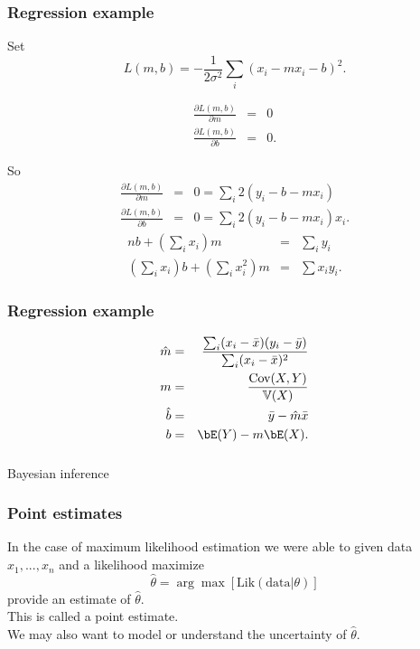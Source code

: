 \begin{frame}[fragile]\frametitle{Regression example}
{\tiny

Set
$$L(m,b) = - \frac{1}{2 \sigma^2} \sum_i (x_i - m x_i - b )^2.$$ 

\begin{eqnarray*}
\frac{\partial L(m,b)}{\partial m} & = & 0 \\
\frac{\partial L(m,b)}{\partial b} & = & 0. 
\end{eqnarray*}

So
\begin{eqnarray*}
\frac{\partial L(m,b)}{\partial m} & = & 0 = \sum_i 2(y_i - b - m x_i) \\
\frac{\partial L(m,b)}{\partial b} & = & 0 = \sum_i 2(y_i - b -m x_i) x_i. 
\end{eqnarray*}
\begin{eqnarray*}
n b + \left(\sum_i x_i \right) m &=& \sum_i y_i \\
\left(\sum_i x_i \right) b + \left(\sum_i x^2_i \right) m &=& \sum x_i y_i .
\end{eqnarray*}


}

\end{frame}


\begin{frame}[fragile]\frametitle{Regression example}
{\tiny

\begin{eqnarray*}
\hat{m} & = & \frac{\sum_i
  (x_i-\bar{x})(y_i-\bar{y})}{\sum_i(x_i-\bar{x})^2} \\ 
m & = & \frac{\mbox{Cov}(X,Y)}{\mathbb V(X)} \\ 
\hat{b} &=& \bar{y} - \hat{m} \bar{x} \\ 
 b & = & \bE(Y) - m \bE(X).
\end{eqnarray*}

}

\end{frame}


\begin{frame}[fragile]\frametitle{}
\begin{center}
{\Large Bayesian inference}

\end{center}
\end{frame}



\begin{frame}[fragile]\frametitle{Point estimates}

In the case of maximum likelihood estimation we were
able to given data $x_1,...,x_n$ and a likelihood
maximize 
$$\hat{\theta} = \arg \max [\mbox{Lik}(\mbox{data}|\theta)]$$
provide an estimate of $\hat{\theta}$. \\ 

This is called a point estimate. \\ 

We may also want to model or understand the uncertainty of
$\hat{\theta}$. 

\end{frame}

